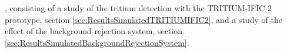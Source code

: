 , consisting of a study of the tritium detection with the TRITIUM-IFIC 2 prototype, section \ref{sec:ResultsSimulatedTRITIUMIFIC2}, and a study of the effect of the background rejection system, section \ref{sec:ResultsSimulatedBackgroundRejectionSystem}.
